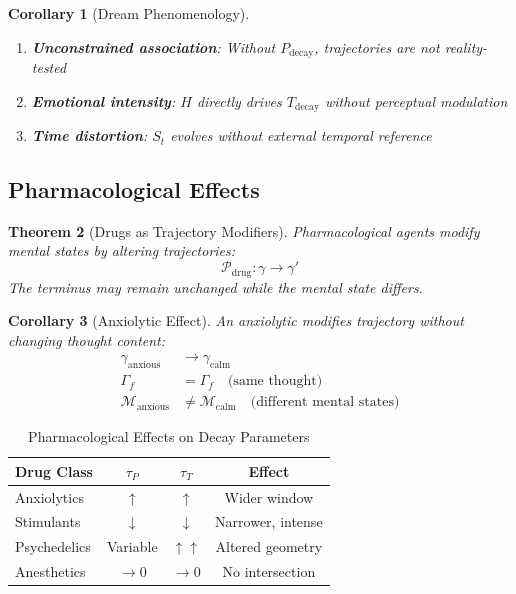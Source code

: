 \documentclass[twocolumn,amsmath,amssymb,aps,prl,superscriptaddress]{revtex4-2}
\newtheorem{theorem}{Theorem}[section]
\newtheorem{corollary}[theorem]{Corollary}
\newcommand{\St}{S_t}
\newcommand{\Mstate}{\mathcal{M}}
\newcommand{\Pdecay}{P_{\text{decay}}}
\newcommand{\Tdecay}{T_{\text{decay}}}
\newcommand{\Hfield}{H}
\newcommand{\Gstate}{\Gamma}
\newcommand{\traj}{\gamma}
\begin{document}
\begin{corollary}[Dream Phenomenology]
\begin{enumerate}
\item \textbf{Unconstrained association}: Without $\Pdecay$, trajectories are not reality-tested
\item \textbf{Emotional intensity}: $\Hfield$ directly drives $\Tdecay$ without perceptual modulation
\item \textbf{Time distortion}: $\St$ evolves without external temporal reference
\end{enumerate}
\end{corollary}

\subsection{Pharmacological Effects}

\begin{theorem}[Drugs as Trajectory Modifiers]
\label{thm:drugs}
Pharmacological agents modify mental states by altering trajectories:
\begin{equation}
\mathcal{P}_{\text{drug}}: \traj \to \traj'
\end{equation}
The terminus may remain unchanged while the mental state differs.
\end{theorem}

\begin{corollary}[Anxiolytic Effect]
An anxiolytic modifies trajectory without changing thought content:
\begin{align}
\traj_{\text{anxious}} &\to \traj_{\text{calm}} \\
\Gstate_f &= \Gstate_f \quad \text{(same thought)} \\
\Mstate_{\text{anxious}} &\neq \Mstate_{\text{calm}} \quad \text{(different mental states)}
\end{align}
\end{corollary}

\begin{table}[h]
\centering
\caption{Pharmacological Effects on Decay Parameters}
\begin{tabular}{lccc}
\toprule
Drug Class & $\tau_P$ & $\tau_T$ & Effect \\
\midrule
Anxiolytics & $\uparrow$ & $\uparrow$ & Wider window \\
Stimulants & $\downarrow$ & $\downarrow$ & Narrower, intense \\
Psychedelics & Variable & $\uparrow\uparrow$ & Altered geometry \\
Anesthetics & $\to 0$ & $\to 0$ & No intersection \\
\bottomrule
\end{tabular}
\end{table}
\end{document}
